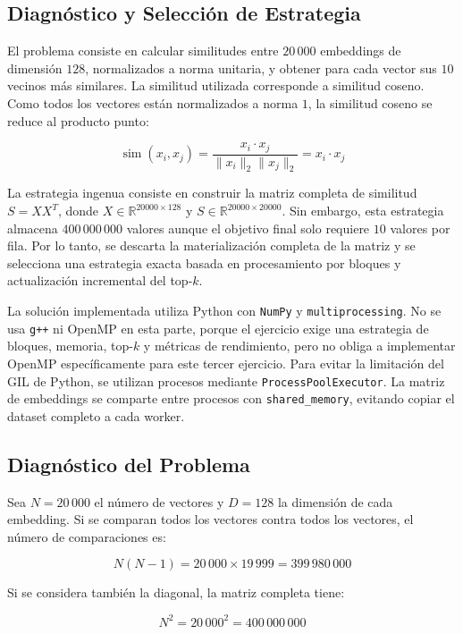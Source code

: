 \documentclass[10pt,a4paper]{article}
\begin{document}
\subsection{Diagn\'ostico y Selecci\'on de Estrategia}

El problema consiste en calcular similitudes entre $20\,000$ embeddings de
dimensi\'on $128$, normalizados a norma unitaria, y obtener para cada vector
sus $10$ vecinos m\'as similares. La similitud utilizada corresponde a
similitud coseno. Como todos los vectores est\'an normalizados a norma $1$, la
similitud coseno se reduce al producto punto:

\[
\operatorname{sim}(x_i,x_j)=
\frac{x_i \cdot x_j}{\|x_i\|_2\|x_j\|_2}
= x_i \cdot x_j
\]

La estrategia ingenua consiste en construir la matriz completa de similitud
$S = XX^T$, donde $X \in \mathbb{R}^{20000 \times 128}$ y
$S \in \mathbb{R}^{20000 \times 20000}$. Sin embargo, esta estrategia almacena
$400\,000\,000$ valores aunque el objetivo final solo requiere $10$ valores por
fila. Por lo tanto, se descarta la materializaci\'on completa de la matriz y se
selecciona una estrategia exacta basada en procesamiento por bloques y
actualizaci\'on incremental del top-$k$.

La soluci\'on implementada utiliza Python con \texttt{NumPy} y
\texttt{multiprocessing}. No se usa \texttt{g++} ni OpenMP en esta parte, porque
el ejercicio exige una estrategia de bloques, memoria, top-$k$ y m\'etricas de
rendimiento, pero no obliga a implementar OpenMP espec\'ificamente para este
tercer ejercicio. Para evitar la limitaci\'on del GIL de Python, se utilizan
procesos mediante \texttt{ProcessPoolExecutor}. La matriz de embeddings se
comparte entre procesos con \texttt{shared\_memory}, evitando copiar el dataset
completo a cada worker.

\subsection{Diagn\'ostico del Problema}

Sea $N=20\,000$ el n\'umero de vectores y $D=128$ la dimensi\'on de cada
embedding. Si se comparan todos los vectores contra todos los vectores, el
n\'umero de comparaciones es:

\[
N(N-1) = 20\,000 \times 19\,999 = 399\,980\,000
\]

Si se considera tambi\'en la diagonal, la matriz completa tiene:

\[
N^2 = 20\,000^2 = 400\,000\,000
\]
\end{document}

